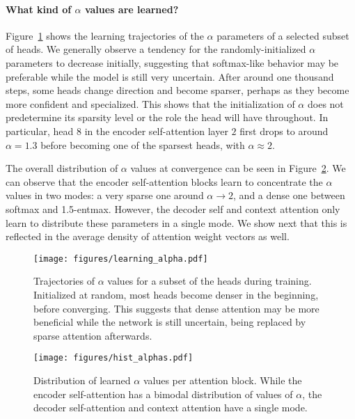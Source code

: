 \documentclass[11pt,a4paper]{article}
\newcommand{\figref}[1]{Figure~\ref{fig:#1}}
\newcommand*\entmaxtext{entmax\xspace}
\begin{document}
\paragraph{What kind of {\boldmath $\alpha$} values are learned?}
\figref{learning_alpha} shows the learning trajectories of the
$\alpha$ parameters of a selected subset of heads. We generally
observe a tendency for the randomly-initialized $\alpha$ parameters
to decrease initially, suggesting that softmax-like behavior may be
preferable while the model is still very uncertain. After around one
thousand steps, some heads change direction and become sparser,
perhaps as they become more confident and specialized. This shows
that the initialization of $\alpha$ does not predetermine its
sparsity level or the role the head will have throughout. In
particular, head $8$ in the encoder self-attention layer $2$ first
drops to around $\alpha=1.3$ before becoming one of the sparsest
heads, with $\alpha\approx2$.

The overall distribution of $\alpha$ values at convergence can be
seen in \figref{hist_alphas}. We can observe that the encoder
self-attention blocks learn to concentrate the $\alpha$ values in two
modes: a very sparse one around $\alpha \rightarrow 2$, and a dense
one between softmax and 1.5-\entmaxtext{}. However, the decoder self
and context attention only learn to distribute these parameters in a
single mode. We show next that this is reflected in the average
density of attention weight vectors as well.

\begin{figure}[t]
    \texttt{[image: figures/learning\_alpha.pdf]}
    \caption{\label{fig:learning_alpha}
    Trajectories of $\alpha$ values for a subset of the heads during
    training. Initialized at random, most heads become denser in the
    beginning, before converging. This suggests that dense attention may
    be more beneficial while the network is still uncertain, being
    replaced by sparse attention afterwards.}
\end{figure}

\begin{figure}[t]
    \texttt{[image: figures/hist\_alphas.pdf]}
    \caption{\label{fig:hist_alphas}Distribution of learned $\alpha$ values per attention block.
    While the encoder self-attention has a bimodal distribution
    of values of $\alpha$,
    the decoder self-attention and context attention have a single mode.}
\end{figure}
\end{document}
